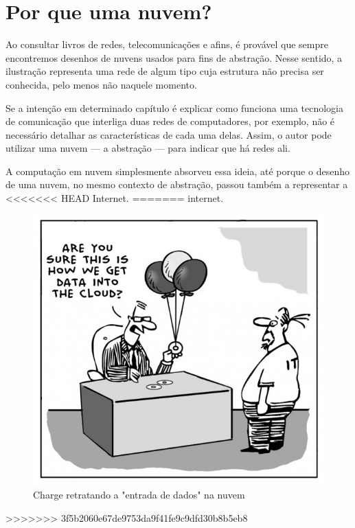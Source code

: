 \section{Por que uma nuvem?}

Ao consultar livros de redes, telecomunicações e afins, é provável que sempre
encontremos desenhos de nuvens usados para fins de abstração. Nesse sentido, a
ilustração representa uma rede de algum tipo cuja estrutura não precisa ser
conhecida, pelo menos não naquele momento.

Se a intenção em determinado capítulo é explicar como funciona uma tecnologia de
comunicação que interliga duas redes de computadores, por exemplo, não é
necessário detalhar as características de cada uma delas. Assim, o autor pode
utilizar uma nuvem --- a abstração --- para indicar que há redes ali.

A computação em nuvem simplesmente absorveu essa ideia, até porque o desenho de
uma nuvem, no mesmo contexto de abstração, passou também a representar a
<<<<<<< HEAD
Internet.
=======
internet.

\begin{figure}[ht]
    \centering
    \includegraphics[height=0.3\textwidth]{img/comic.jpg}
    \caption{Charge retratando a "entrada de dados" na nuvem}
\end{figure}
>>>>>>> 3f5b2060e67de9753da9f41fe9c9dfd30b8b5eb8
